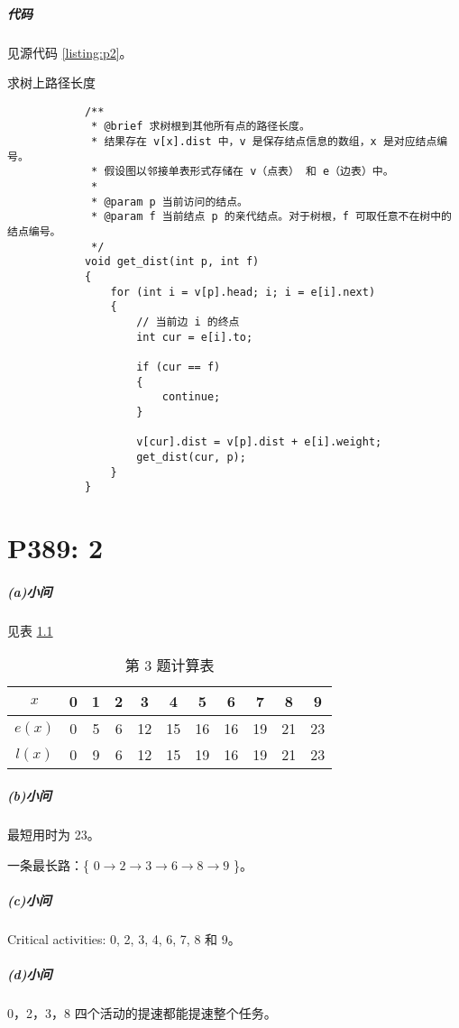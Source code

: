 \documentclass{ctexrep}
\begin{document}
    \paragraph{代码} 见源代码 \ref{listing:p2}。

    \begin{listing}[hp]
        \centering
        \caption{求树上路径长度}
        \label{listing:p2}
        \begin{verbatim}
            /**
             * @brief 求树根到其他所有点的路径长度。
             * 结果存在 v[x].dist 中，v 是保存结点信息的数组，x 是对应结点编号。
             * 假设图以邻接单表形式存储在 v（点表） 和 e（边表）中。
             *
             * @param p 当前访问的结点。
             * @param f 当前结点 p 的亲代结点。对于树根，f 可取任意不在树中的结点编号。
             */
            void get_dist(int p, int f)
            {
                for (int i = v[p].head; i; i = e[i].next)
                {
                    // 当前边 i 的终点
                    int cur = e[i].to;

                    if (cur == f)
                    {
                        continue;
                    }

                    v[cur].dist = v[p].dist + e[i].weight;
                    get_dist(cur, p);
                }
            }
        \end{verbatim}
    \end{listing}

    \chapter{P389: 2}

    \paragraph{(a)小问} 见表 \ref{table:p3_cal}

    \begin{table}[hp]
        \centering
        \caption{第 3 题计算表}
        \label{table:p3_cal}
        \begin{tabular}{|*{11}{c|}}
            \hline
            $x$    & 0 & 1 & 2 & 3  & 4  & 5  & 6  & 7  & 8  & 9 \\ \hline
            $e(x)$ & 0 & 5 & 6 & 12 & 15 & 16 & 16 & 19 & 21 & 23 \\ \hline
            $l(x)$ & 0 & 9 & 6 & 12 & 15 & 19 & 16 & 19 & 21 & 23 \\ \hline
        \end{tabular}
    \end{table}

    \paragraph{(b)小问} 最短用时为 23。

    一条最长路：\{ $0 \rightarrow 2 \rightarrow 3 \rightarrow 6 \rightarrow 8 \rightarrow 9$ \}。

    \paragraph{(c)小问} Critical activities: 0, 2, 3, 4, 6, 7, 8 和 9。

    \paragraph{(d)小问} 0，2，3，8 四个活动的提速都能提速整个任务。
\end{document}
